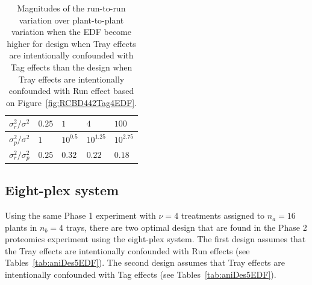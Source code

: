 \begin{table}[!h]
\centering
\caption{Magnitudes of the run-to-run variation over plant-to-plant variation when the EDF become higher for design when Tray effects are intentionally confounded with Tag effects than the design when Tray effects are intentionally confounded with Run effect based on Figure~\ref{fig:RCBD442Tag4EDF}.}
\begin{tabular}{|c|l|l|l|l|}
\hline 
$\sigma_r^2/\sigma^2$ 	& $0.25$ & $1$ & $4$ & $100$ \\ 
\hline 
$\sigma_p^2/\sigma^2$ 	& $1$ & $ 10^{0.5}$ & $10^{1.25}$ & $10^{2.75}$ \\ 
\hline 
$\sigma_r^2/\sigma_p^2$ & $0.25$ & $0.32$ & $0.22$ & $0.18$ \\ 
\hline 
\end{tabular} 
\label{tab:edfCompare1}
\end{table}




\subsection{Eight-plex system}
Using the same Phase 1 experiment with $\nu = 4$ treatments assigned to $n_a = 16$ plants in $n_b = 4$ trays, there are two optimal design that are found in the Phase 2 proteomics experiment using the eight-plex system. The first design assumes that the Tray effects are intentionally confounded with Run effects (see Tables~\ref{tab:aniDes5EDF}). The second design assumes that Tray effects are intentionally confounded with Tag effects (see Tables~\ref{tab:aniDes5EDF}).

